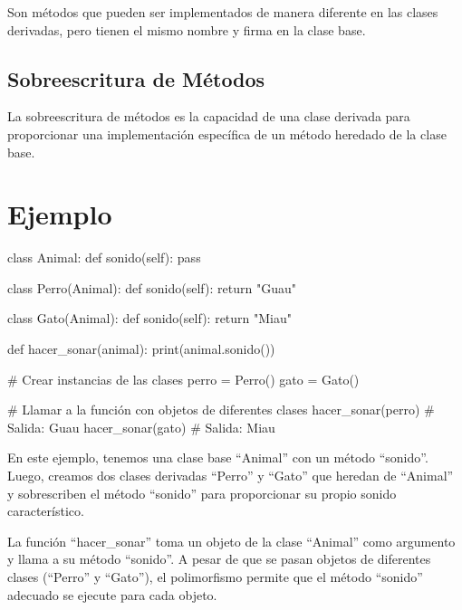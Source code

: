 \documentclass[
  a4paper,
  DIV=11,
  numbers=noendperiod,
  onepage,
  openany]{scrreprt}
\newenvironment{Shaded}{\begin{snugshade}}{\end{snugshade}}
\newcommand{\BuiltInTok}[1]{\textcolor[rgb]{0.00,0.23,0.31}{#1}}
\newcommand{\CommentTok}[1]{\textcolor[rgb]{0.37,0.37,0.37}{#1}}
\newcommand{\ControlFlowTok}[1]{\textcolor[rgb]{0.00,0.23,0.31}{#1}}
\newcommand{\KeywordTok}[1]{\textcolor[rgb]{0.00,0.23,0.31}{#1}}
\newcommand{\NormalTok}[1]{\textcolor[rgb]{0.00,0.23,0.31}{#1}}
\newcommand{\OperatorTok}[1]{\textcolor[rgb]{0.37,0.37,0.37}{#1}}
\newcommand{\StringTok}[1]{\textcolor[rgb]{0.13,0.47,0.30}{#1}}
\newcommand{\VariableTok}[1]{\textcolor[rgb]{0.07,0.07,0.07}{#1}}
\begin{document}
Son métodos que pueden ser implementados de manera diferente en las
clases derivadas, pero tienen el mismo nombre y firma en la clase base.

\subsection{Sobreescritura de
Métodos}\label{sobreescritura-de-muxe9todos}

La sobreescritura de métodos es la capacidad de una clase derivada para
proporcionar una implementación específica de un método heredado de la
clase base.

\section{Ejemplo}\label{ejemplo-18}

\begin{Shaded}
\begin{Highlighting}[]
\KeywordTok{class}\NormalTok{ Animal:}
    \KeywordTok{def}\NormalTok{ sonido(}\VariableTok{self}\NormalTok{):}
        \ControlFlowTok{pass}

\KeywordTok{class}\NormalTok{ Perro(Animal):}
    \KeywordTok{def}\NormalTok{ sonido(}\VariableTok{self}\NormalTok{):}
        \ControlFlowTok{return} \StringTok{"Guau"}

\KeywordTok{class}\NormalTok{ Gato(Animal):}
    \KeywordTok{def}\NormalTok{ sonido(}\VariableTok{self}\NormalTok{):}
        \ControlFlowTok{return} \StringTok{"Miau"}

\KeywordTok{def}\NormalTok{ hacer\_sonar(animal):}
    \BuiltInTok{print}\NormalTok{(animal.sonido())}

\CommentTok{\# Crear instancias de las clases}
\NormalTok{perro }\OperatorTok{=}\NormalTok{ Perro()}
\NormalTok{gato }\OperatorTok{=}\NormalTok{ Gato()}

\CommentTok{\# Llamar a la función con objetos de diferentes clases}
\NormalTok{hacer\_sonar(perro)  }\CommentTok{\# Salida: Guau}
\NormalTok{hacer\_sonar(gato)   }\CommentTok{\# Salida: Miau}
\end{Highlighting}
\end{Shaded}

En este ejemplo, tenemos una clase base ``Animal'' con un método
``sonido''. Luego, creamos dos clases derivadas ``Perro'' y ``Gato'' que
heredan de ``Animal'' y sobrescriben el método ``sonido'' para
proporcionar su propio sonido característico.

La función ``hacer\_sonar'' toma un objeto de la clase ``Animal'' como
argumento y llama a su método ``sonido''. A pesar de que se pasan
objetos de diferentes clases (``Perro'' y ``Gato''), el polimorfismo
permite que el método ``sonido'' adecuado se ejecute para cada objeto.
\end{document}
